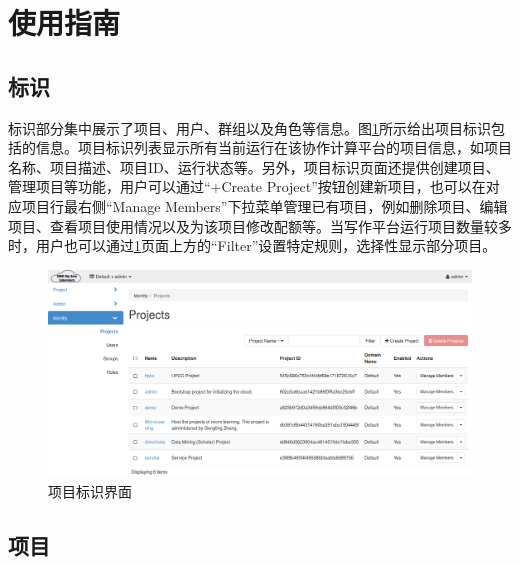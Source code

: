 \documentclass[12pt]{ctexart}%
\begin{document}
\section{使用指南}

\subsection{标识}
标识部分集中展示了项目、用户、群组以及角色等信息。图\ref{fig:identityprojects}所示给出项目标识包括的信息。项目标识列表显示所有当前运行在该协作计算平台的项目信息，如项目名称、项目描述、项目ID、运行状态等。另外，项目标识页面还提供创建项目、管理项目等功能，用户可以通过“+Create Project”按钮创建新项目，也可以在对应项目行最右侧“Manage Members”下拉菜单管理已有项目，例如删除项目、编辑项目、查看项目使用情况以及为该项目修改配额等。当写作平台运行项目数量较多时，用户也可以通过\ref{fig:identityprojects}页面上方的“Filter”设置特定规则，选择性显示部分项目。
\begin{figure}[!htb]
\centering
\includegraphics[width=5in]{./figures/Identity_Projects}
\caption{项目标识界面}
\label{fig:identityprojects}
\end{figure}





\subsection{项目}
\end{document}

